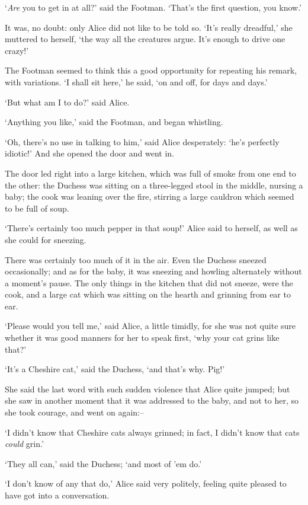   `{\it Are} you to get in at all?' said the Footman.  `That's the
first question, you know.'

  It was, no doubt:  only Alice did not like to be told so.
`It's really dreadful,' she muttered to herself, `the way all the
creatures argue.  It's enough to drive one crazy!'

  The Footman seemed to think this a good opportunity for
repeating his remark, with variations.  `I shall sit here,' he
said, `on and off, for days and days.'

  `But what am I to do?' said Alice.

  `Anything you like,' said the Footman, and began whistling.

  `Oh, there's no use in talking to him,' said Alice desperately:
`he's perfectly idiotic!'  And she opened the door and went in.

  The door led right into a large kitchen, which was full of
smoke from one end to the other:  the Duchess was sitting on a
three-legged stool in the middle, nursing a baby; the cook was
leaning over the fire, stirring a large cauldron which seemed to
be full of soup.

  `There's certainly too much pepper in that soup!' Alice said to
herself, as well as she could for sneezing.

  There was certainly too much of it in the air.  Even the
Duchess sneezed occasionally; and as for the baby, it was
sneezing and howling alternately without a moment's pause.  The
only things in the kitchen that did not sneeze, were the cook,
and a large cat which was sitting on the hearth and grinning from
ear to ear.

  `Please would you tell me,' said Alice, a little timidly, for
she was not quite sure whether it was good manners for her to
speak first, `why your cat grins like that?'

  `It's a Cheshire cat,' said the Duchess, `and that's why.  Pig!'

  She said the last word with such sudden violence that Alice
quite jumped; but she saw in another moment that it was addressed
to the baby, and not to her, so she took courage, and went on
again:--

  `I didn't know that Cheshire cats always grinned; in fact, I
didn't know that cats {\it could} grin.'

  `They all can,' said the Duchess; `and most of 'em do.'

  `I don't know of any that do,' Alice said very politely,
feeling quite pleased to have got into a conversation.

